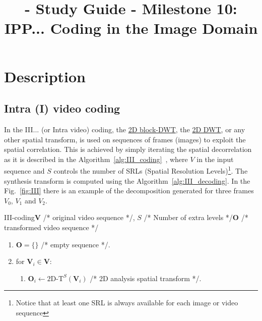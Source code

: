 
\title{\SM{} - Study Guide - Milestone 10: IPP... Coding in the Image Domain}

\maketitle

\tableofcontents

\section{Description}

\subsection{Intra (I) video coding}

In the III... (or Intra video) coding, the
\href{https://sistemas-multimedia.github.io/milestones/07-DCT/}{2D
  block-DWT}, the
\href{https://sistemas-multimedia.github.io/milestones/08-DWT/}{2D
  DWT}, or any other spatial transform, is used on sequences of frames
(images) to exploit the spatial correlation. This is achieved by
simply iterating the spatial decorrelation as it is described in the
Algorithm~\ref{alg:III_coding}~\cite{taubman2002jpeg2000}, where $V$
in the input sequence and $S$ controls the number of SRLs (Spatial
Resolution Levels)\footnote{Notice that at least one SRL is always
available for each image or video sequence}. The synthesis transform
is computed using the Algorithm~\ref{alg:III_decoding}. In the
Fig.~\ref{fig:III} there is an example of the decomposition generated
for three frames $V_0$, $V_1$ and $V_2$.

\begin{myalg}{III-coding}{$\mathbf{V}$ /* original video sequence */, $S$ /* Number of extra levels */}{$\mathbf{O}$ /* transformed video sequence */}
  \label{alg:III_coding}
  \begin{enumerate}
  \item ${\mathbf O}=\{\}$ /* empty sequence */.
  \item for ${\mathbf V}_i\in {\mathbf V}$:
    \begin{enumerate}
    \item ${\mathbf O}_i\leftarrow\text{2D-T}^{S}({\mathbf V}_i)$ /* 2D analysis spatial transform */.
    \end{enumerate}
  \end{enumerate}
\end{myalg}

